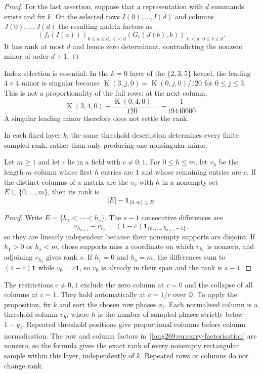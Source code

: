 \documentclass[11pt]{article}
\theoremstyle{remark}
\theoremstyle{plain}
\newcommand{\Kernel}{\operatorname{K}}
\begin{document}
\begin{proof}
For the last assertion, suppose that a representation with $d$ summands
exists and fix $k$.  On the selected rows $I(0),\ldots,I(d)$ and columns
$J(0),\ldots,J(d)$ the resulting matrix factors as
\[
 (f_\ell(I(a)))_{0\le a\le d,\,\ell<d}
 (G_\ell(J(b),k))_{\ell<d,\,0\le b\le d}.
\]
It has rank at most $d$ and hence zero determinant, contradicting the
nonzero minor of order $d+1$.
\end{proof}


Index selection is essential.  In the $k=0$ layer of the $\{2,3,5\}$
kernel, the leading $4\times4$ minor is singular because
$\Kernel(3,j,0)=\Kernel(0,j,0)/120$ for $0\le j\le3$.
This is not a proportionality of the full rows: at the next column,
\[
 \Kernel(3,4,0)-\frac{\Kernel(0,4,0)}{120}=-\frac1{19440000}.
\]
A singular leading minor therefore does not settle the rank.

In each fixed layer $k$, the same threshold description determines every
finite sampled rank, rather than only producing one nonsingular minor.

\begin{proposition}\label{long269:res:finite-cut-rank}
Let $m\ge1$ and let $c$ lie in a field with $c\ne0,1$.  For $0\le h\le m$,
let $v_h$ be the length-$m$ column whose first $h$ entries are $1$ and whose
remaining entries are $c$.  If the distinct columns of a matrix are the
$v_h$ with $h$ in a nonempty set $E\subseteq\{0,\ldots,m\}$, then its rank is
\[
 |E|-\mathbf 1_{\{0,m\}\subseteq E}.
\]
\end{proposition}

\begin{proof}
Write $E=\{h_1<\cdots<h_s\}$.  The $s-1$ consecutive differences are
\[
 v_{h_{a+1}}-v_{h_a}
   =(1-c)\mathbf 1_{\{h_a,\ldots,h_{a+1}-1\}},
\]
so they are linearly independent because their nonempty supports are
disjoint.  If $h_1>0$ or $h_s<m$, those supports miss a coordinate on which
$v_{h_1}$ is nonzero, and adjoining $v_{h_1}$ gives rank $s$.  If
$h_1=0$ and $h_s=m$, the differences sum to $(1-c)\mathbf 1$ while
$v_0=c\mathbf 1$, so $v_0$ is already in their span and the rank is $s-1$.
\end{proof}

The restrictions $c\ne0,1$ exclude the zero column at $c=0$ and the
collapse of all columns at $c=1$.  They hold automatically at $c=1/r$ over
$\mathbb Q$.
To apply the proposition, fix $k$ and sort the chosen row phases $x_i$.
Each normalised column is a threshold column $v_h$, where $h$ is the
number of sampled phases strictly below $1-y_j$.  Repeated threshold
positions give proportional columns before column normalisation.
The row and column factors in~\eqref{long269:eq:carry-factorisation} are
nonzero, so the formula gives the exact rank of every nonempty rectangular
sample within this layer, independently of $k$.  Repeated rows or columns
do not change rank.
\end{document}
